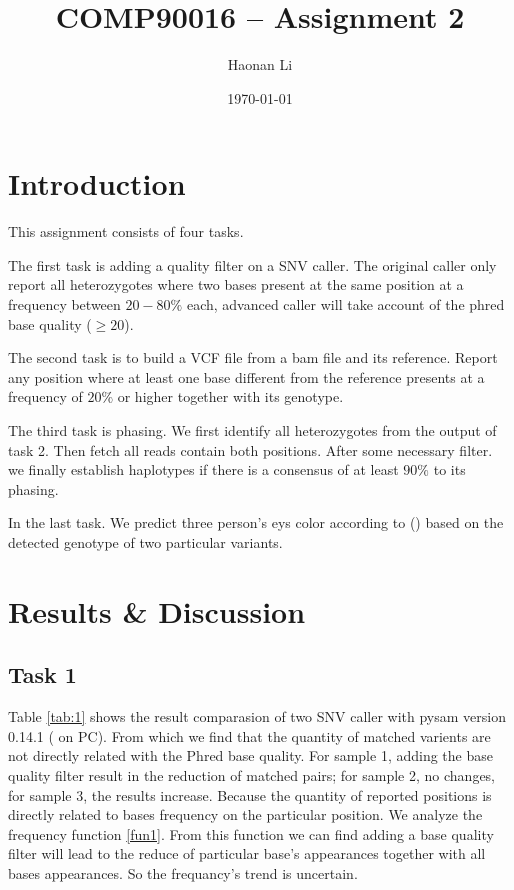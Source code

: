 \documentclass[a4paper]{article}
\title{\bfseries{COMP90016 -- Assignment 2 }}
\author{Haonan Li}
\date{\today}
\begin{document}
\maketitle

\section{Introduction}
\label{sec:introduction}

This assignment consists of four tasks. 

The first task is adding a quality filter on a SNV caller. The original caller only report all heterozygotes where two bases present at the same position at a frequency between $20-80\%$ each, advanced caller will take account of the phred base quality ($\geq 20$).

The second task is to build a VCF file from a bam file and its reference. Report any position where at least one base different from the reference presents at a frequency of $20\%$ or higher together with its genotype.

The third task is phasing. We first identify all heterozygotes from the output of task 2. Then fetch all reads contain both positions. After some necessary filter. we finally establish haplotypes if there is a consensus of at least $90\%$ to its phasing. 

In the last task. We predict three person's eys color according to (\cite{Sturm2008A}) based on the detected genotype of two particular variants.

\section{Results \& Discussion}
\label{sec:experiment}
\subsection{Task 1}

Table \ref{tab:1} shows the result comparasion of two SNV caller with pysam version 0.14.1 ( on PC). From which we find that the quantity of matched varients are not directly related with the Phred base quality. For sample 1, adding the base quality filter result in the reduction of matched pairs; for sample 2, no changes, for sample 3, the results increase. Because the quantity of reported positions is directly related to bases frequency on the particular position. We analyze the frequency function \ref{fun1}. From this function we can find adding a base quality filter will lead to the reduce of particular base's appearances together with all bases appearances. So the frequancy's trend is uncertain.
\end{document}

